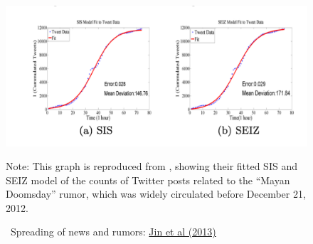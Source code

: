	\begin{figure}[!ht] \centering  %
		\caption{ ~Spreading of news and rumors: \href{https://people.cs.vt.edu/ramakris/papers/news-rumor-epi-snakdd13.pdf}{Jin et al (2013)}}\nocite{jin2013epidemiological}
		\label{fig:news_curve}
		\centerline{\includegraphics[width=\textwidth]{./figures/Doomsday}}
		\begin{flushleft}{\footnotesize Note: This graph is reproduced from \cite{jin2013epidemiological}, showing their fitted SIS and SEIZ model of the counts of Twitter posts related to the ``Mayan Doomsday'' rumor, which was widely circulated before December 21, 2012.}
		\end{flushleft}
	\end{figure}
